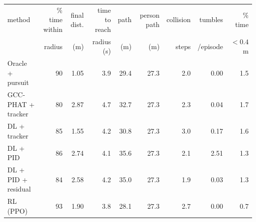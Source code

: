 \begin{tabular}{lrrrrrrrr}
\toprule
method & \% time within & final dist. & time to reach & path & person path & collision & tumbles & \% time\\
 & radius & (m) & radius (s) & (m) & (m) & steps & /episode & $<0.4$ m\\
\midrule
Oracle + pursuit & 90 & 1.05 & 3.9 & 29.4 & 27.3 & 2.0 & 0.00 & 1.5 \\
GCC-PHAT + tracker & 80 & 2.87 & 4.7 & 32.7 & 27.3 & 2.3 & 0.04 & 1.7 \\
DL + tracker & 85 & 1.55 & 4.2 & 30.8 & 27.3 & 3.0 & 0.17 & 1.6 \\
DL + PID & 86 & 2.74 & 4.1 & 35.6 & 27.3 & 2.1 & 2.51 & 1.3 \\
DL + PID + residual & 84 & 2.58 & 4.2 & 35.0 & 27.3 & 1.9 & 0.03 & 1.3 \\
RL (PPO) & 93 & 1.90 & 3.8 & 28.1 & 27.3 & 2.7 & 0.00 & 0.7 \\
\bottomrule
\end{tabular}

